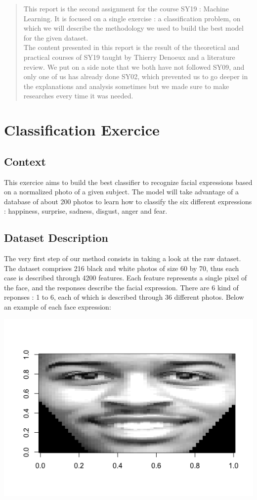 \documentclass[]{report}
\begin{document}
\begin{abstract}

	This report is the second assignment for the course SY19 : Machine Learning. It is focused on a single exercise : a classification problem, on which we will describe the methodology we used to build the best model for the given dataset.\\
	The content presented in this report is the result of the theoretical and practical courses of SY19 taught by Thierry Denoeux and a literature review. We put on a side note that we both have not followed SY09, and only one of us has already done SY02, which prevented us to go deeper in the explanations and analysis sometimes but we made sure to make researches every time it was needed.
	
\end{abstract}

\tableofcontents

\chapter{Classification Exercice}



\section{Context}
This exercice aims to build the best classifier to recognize facial expressions based on a normalized photo of a given subject. The model will take advantage of a database of about 200 photos to learn how to classify the six different expressions : happiness, surprise, sadness, disgust, anger and fear.

\section{Dataset Description}
The very first step of our method consists in taking a look at the raw dataset. The dataset comprises 216 black and white photos of size 60 by 70, thus each case is described through 4200 features. Each feature represents a single pixel of the face, and the responses describe the facial expression. There are 6 kind of reponses : 1 to 6, each of which is described through 36 different photos. Below an example of each face expression:


\begin{center}
	\includegraphics[width=0.6\linewidth]{Figures/happy_X32_y1.png}
	\label{fig:y=1}
\end{center}
\end{document}
